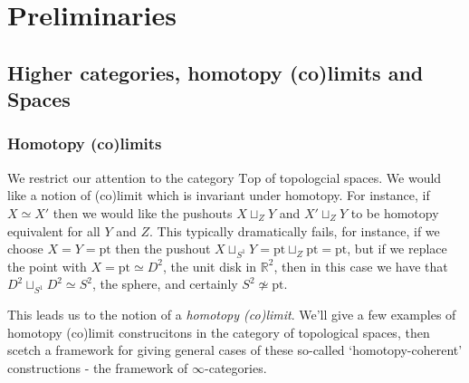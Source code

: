 \newpage
\section{Preliminaries}
\subsection{Higher categories, homotopy (co)limits and Spaces}

\subsubsection{Homotopy (co)limits}
We restrict our attention to the category $\text{Top}$ of topologcial spaces. We would like a notion of (co)limit which is invariant under homotopy. For instance, if $X \simeq X'$ then we would like the pushouts $X \sqcup_Z Y$ and $X' \sqcup_Z Y$ to be homotopy equivalent for all $Y$ and $Z$. This typically dramatically fails, for instance, if we choose $X = Y = \text{pt}$ then the pushout $X \sqcup_{S^1} Y = \text{pt} \sqcup_Z \text{pt} = \text{pt}$, but if we replace the point with $X = \text{pt} \simeq D^2$, the unit disk in $\mathbb{R}^2$, then in this case we have that $D^2 \sqcup_{S^1} D^2 \simeq S^2$, the sphere, and certainly $S^2 \not\simeq \text{pt}$.

This leads us to the notion of a \textit{homotopy (co)limit}. We'll give a few examples of homotopy (co)limit construcitons in the category of topological spaces, then scetch a framework for giving general cases of these so-called `homotopy-coherent' constructions - the framework of $\infty$-categories.


